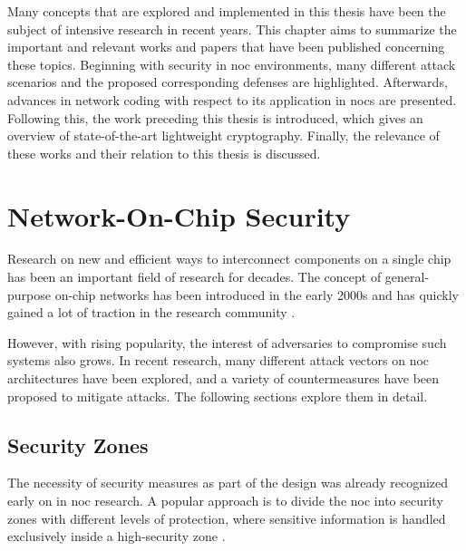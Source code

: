 Many concepts that are explored and implemented in this thesis have been the subject of intensive research in recent years. This chapter aims to
summarize the important and relevant works and papers that have been published concerning these topics. Beginning with security in \gls{noc}
environments, many different attack scenarios and the proposed corresponding defenses are highlighted. Afterwards, advances in network coding with
respect to its application in \glspl{noc} are presented. Following this, the work preceding this thesis is introduced, which gives an overview of
state-of-the-art lightweight cryptography. Finally, the relevance of these works and their relation to this thesis is discussed.

\section{Network-On-Chip Security}\label{sec:nocsecurity}
Research on new and efficient ways to interconnect components on a single chip has been an important field of research for decades. The concept of
general-purpose on-chip networks has been introduced in the early 2000s
\cites{dally01routepacketsnotwires}{kumar02networkonchip}{benini02nocparadigm} and has quickly gained a lot of traction in the research community
\cite[e.g.][]{ivanov05nocintroduction}. 

However, with rising popularity, the interest of adversaries to compromise such systems also grows. In recent research, many different attack vectors
on \gls{noc} architectures have been explored, and a variety of countermeasures have been proposed to mitigate attacks. The following sections
explore them in detail.

\subsection{Security Zones}\label{subsec:securityzones}
The necessity of security measures as part of the design was already recognized early on in \gls{noc} research. A popular approach is to
divide the \gls{noc} into security zones with different levels of protection, where sensitive information is handled exclusively inside a
high-security zone \cites(e.g.)(){gebotys03securityframework}{fernandes16nocrouting}{kapoor13nocauthenc}.


